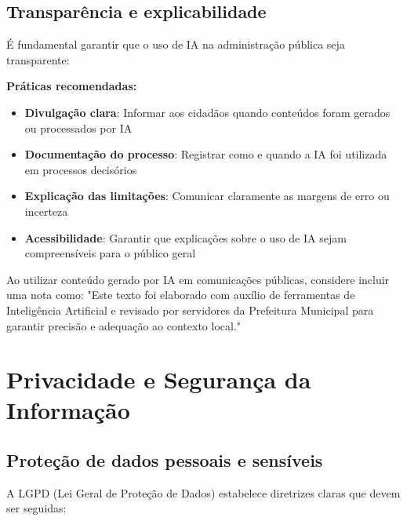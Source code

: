 \documentclass[12pt,a4paper]{book}
\begin{document}
\subsection{Transparência e explicabilidade}

É fundamental garantir que o uso de IA na administração pública seja transparente:

\textbf{Práticas recomendadas:}
\begin{itemize}
    \item \textbf{Divulgação clara}: Informar aos cidadãos quando conteúdos foram gerados ou processados por IA
    
    \item \textbf{Documentação do processo}: Registrar como e quando a IA foi utilizada em processos decisórios
    
    \item \textbf{Explicação das limitações}: Comunicar claramente as margens de erro ou incerteza
    
    \item \textbf{Acessibilidade}: Garantir que explicações sobre o uso de IA sejam compreensíveis para o público geral
\end{itemize}

\begin{tcolorbox}[dica]
Ao utilizar conteúdo gerado por IA em comunicações públicas, considere incluir uma nota como: "Este texto foi elaborado com auxílio de ferramentas de Inteligência Artificial e revisado por servidores da Prefeitura Municipal para garantir precisão e adequação ao contexto local."
\end{tcolorbox}

\section{Privacidade e Segurança da Informação}

\subsection{Proteção de dados pessoais e sensíveis}

A LGPD (Lei Geral de Proteção de Dados) estabelece diretrizes claras que devem ser seguidas:
\end{document}
